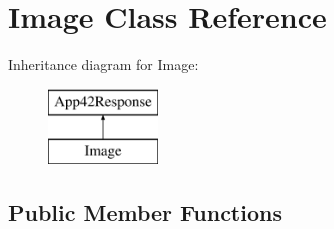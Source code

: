 \hypertarget{class_image}{\section{Image Class Reference}
\label{class_image}
}
Inheritance diagram for Image\+:\begin{figure}[H]
\begin{center}
\leavevmode
\includegraphics[height=2.000000cm]{class_image}
\end{center}
\end{figure}
\subsection*{Public Member Functions}
